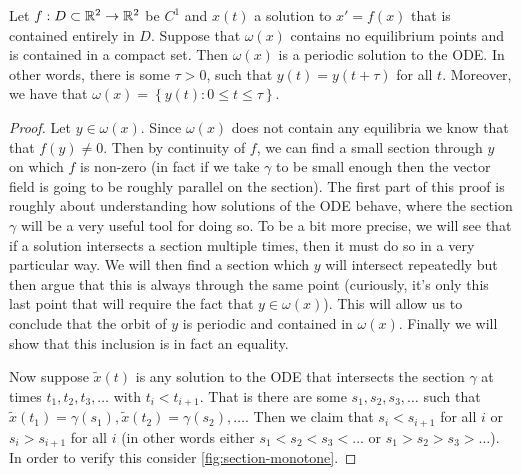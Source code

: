 \begin{theorem}
Let $f: D \subset \mathbb{R}^2 \to \mathbb{R}^2$ be $C^1$ and $x(t)$ a solution to $x' = f(x)$ that is contained entirely in $D$. Suppose that $\omega(x)$ contains no equilibrium points and is contained in a compact set. Then $\omega(x)$ is a periodic solution to the ODE. In other words, there is some $\tau > 0$, such that $y(t) = y(t + \tau)$ for all $t$. Moreover, we have that $\omega(x) = \left\{y(t) : 0 \leq t \leq \tau\right\}$.
\end{theorem}
\begin{proof}
Let $y \in \omega(x)$. Since $\omega(x)$ does not contain any equilibria we know that that $f(y) \neq 0$. Then by continuity of $f$, we can find a small section through $y$ on which $f$ is non-zero (in fact if we take $\gamma$ to be small enough then the vector field is going to be roughly parallel on the section). The first part of this proof is roughly about understanding how solutions of the ODE behave, where the section $\gamma$ will be a very useful tool for doing so. To be a bit more precise, we will see that if a solution intersects a section multiple times, then it must do so in a very particular way. We will then find a section which $y$ will intersect repeatedly but then argue that this is always through the same point (curiously, it's only this last point that will require the fact that $y \in \omega(x)$). This will allow us to conclude that the orbit of $y$ is periodic and contained in $\omega(x)$. Finally we will show that this inclusion is in fact an equality.

Now suppose $\tilde{x}(t)$ is any solution to the ODE that intersects the section $\gamma$ at times $t_1, t_2, t_3, \dots$ with $t_i < t_{i + 1}$. That is there are some $s_1, s_2, s_3, \dots$ such that $\tilde{x}(t_1) = \gamma(s_1), \tilde{x}(t_2) = \gamma(s_2), \dots$. Then we claim that $s_i < s_{i + 1}$ for all $i$ or $s_i > s_{i + 1}$ for all $i$ (in other words either $s_1 < s_2 < s_3 < \dots$ or $s_1 > s_2 > s_3 > \dots$). In order to verify this consider \autoref{fig:section-monotone}.


\end{proof}
